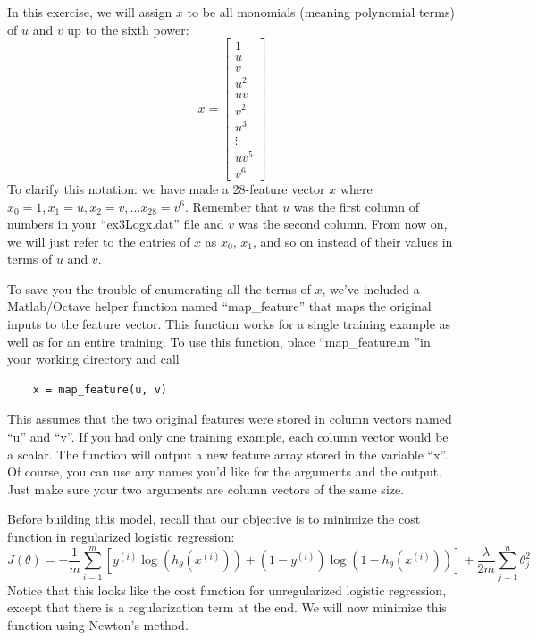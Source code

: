 \documentclass[10pt,a4paper]{article}
\begin{document}
  In this exercise, we will assign $x$ to be all monomials (meaning polynomial terms) of $u$ and $v$ up to the sixth power: 
  \begin{displaymath}
    x=\left[\begin{array}{c}
    1\\
    u\\
    v\\
    u^2\\
    uv\\
    v^2\\
    u^3\\
    \vdots\\
    uv^5\\
    v^6\end{array}\right]
  \end{displaymath}
  To clarify this notation: we have made a 28-feature vector $x$ where  $x_0 = 1, x_1=u, x_2= v,\ldots x_{28} =v^6$. Remember that $u$ was the first column of numbers in your ``ex3Logx.dat'' file and $v$ was the second column. From now on, we will just refer to the entries of $x$ as $x_0$, $x_1$, and so on instead of their values in terms of $u$ and $v$.


  To save you the trouble of enumerating all the terms of $x$, we've included a Matlab/Octave helper function named ``map\_feature'' that maps the original inputs to the feature vector. This function works for a single training example as well as for an entire training. To use this function, place ``map\_feature.m ''in your working directory and call
  \begin{lstlisting}
    x = map_feature(u, v)
  \end{lstlisting}
  This assumes that the two original features were stored in column vectors named ``u'' and ``v''. If you had only one training example, each column vector would be a scalar. The function will output a new feature array stored in the variable ``x''. Of course, you can use any names you'd like for the arguments and the output. Just make sure your two arguments are column vectors of the same size.

  Before building this model, recall that our objective is to minimize the cost function in regularized logistic regression: 
  \begin{displaymath}
    J(\theta) = -\frac{1}{m} \sum^m_{i=1} [y^{(i)} \log(h_\theta(x^{(i)})) + (1-y^{(i)}) \log(1 - h_\theta(x^{(i)}))] + \frac{\lambda}{2m} \sum^n_{j=1} \theta^2_j 
  \end{displaymath}
  Notice that this looks like the cost function for unregularized logistic regression, except that there is a regularization term at the end. We will now minimize this function using Newton's method.
\end{document}
